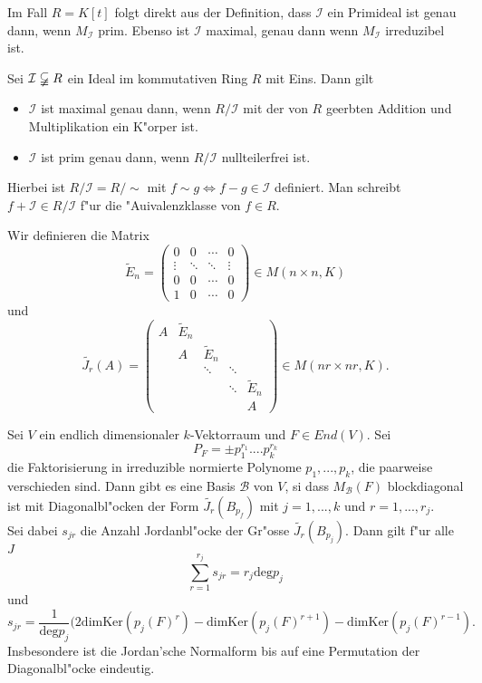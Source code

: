 \documentclass[9pt, a4paper, twocolumn, landscape]{article}
\begin{document}
{ \begin{remark}
 Im Fall $R = K[t]$ folgt direkt aus der Definition, dass $\mathcal{I}$ ein Primideal ist genau dann, wenn $M_\mathcal{I}$ prim. Ebenso ist $\mathcal{I}$ maximal, genau dann wenn $M_\mathcal{I}$ irreduzibel ist.
 \end{remark}
 
 \begin{lemma}
 Sei $\mathcal{I} \varsubsetneqq R$ ein Ideal im kommutativen Ring $R$ mit Eins. Dann gilt \begin{itemize}
 \item $\mathcal{I}$ ist maximal genau dann, wenn $R / \mathcal{I}$ mit der von $R$ geerbten Addition und Multiplikation ein K"orper ist.
 \item $\mathcal{I}$ ist prim genau dann, wenn $R/ \mathcal{I}$ nullteilerfrei ist.
 \end{itemize}
 Hierbei ist $R / \mathcal{I} = R / \sim$ mit $f \sim g \Leftrightarrow f - g \in \mathcal{I}$ definiert. Man schreibt $f + \mathcal{I} \in R / \mathcal{I}$ f"ur die "Auivalenzklasse von $f \in R$. 
 \end{lemma}
 
 

 \begin{definition}
 Wir definieren die Matrix
 $$
 \tilde{E}_n =
\left(\begin{array}{cccc}0 & 0 & \cdots & 0 \\ \vdots & \ddots & \ddots & \vdots \\ 0 & 0 & \cdots & 0 \\ 1 & 0 & \cdots & 0\end{array}\right) \in M(n \times n, K)
 $$
 und 
 $$
 \tilde{J_r}(A)
=\left(\begin{array}{ccccc}A & \tilde{E}_{n} & & & \\ & A & \tilde{E}_{n} & & \\ & & \ddots & \ddots & \\ & & & \ddots & \tilde{E}_{n} \\ & & & & A\end{array}\right) \in M(n r \times n r, K).
 $$
 \end{definition}
 
 
 \begin{theorem}
 Sei $V$ ein endlich dimensionaler $k$-Vektorraum und $F \in End(V)$. Sei
 $$
 P_F = \pm p_1^{r_1} .... p_k^{r_k}
 $$
 die Faktorisierung in irreduzible normierte Polynome $p_1, ..., p_k$, die paarweise verschieden sind. Dann gibt es eine Basis $\mathcal{B}$ von $V$, si dass $M_\mathcal{B}(F)$ blockdiagonal ist mit Diagonalbl"ocken der Form $\tilde{J_r}(B_{p_f})$ mit $j = 1, ..., k$ und $r = 1, ..., r_j$.
 \\ Sei dabei $s_{jr}$ die Anzahl Jordanbl"ocke der Gr"osse $\tilde{J_r}(B_{p_j})$. 
 Dann gilt f"ur alle $J$
 $$
 \sum\limits_{r = 1}^{r_j} s_{jr} = r_j \mathrm{deg} p_j
 $$
 und 
 $$
 s_{jr} = \frac{1}{\mathrm{deg}  p_j}(2 \mathrm{dim} \mathrm{Ker} (p_j(F)^r) -\mathrm{dim} \mathrm{Ker}(p_j(F)^{r+1}) - \mathrm{dim} \mathrm{Ker}(p_j(F)^{r-1}).
 $$
 Insbesondere ist die Jordan'sche Normalform bis auf eine Permutation der Diagonalbl"ocke eindeutig.
  

\end{theorem}}
\end{document}
